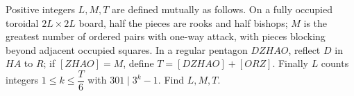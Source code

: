 Positive integers $L,M,T$ are defined mutually as follows. On a fully occupied toroidal $2L\times2L$ board, half the pieces are rooks and half bishops; $M$ is the greatest number of ordered pairs with one-way attack, with pieces blocking beyond adjacent occupied squares. In a regular pentagon $DZHAO$, reflect $D$ in $HA$ to $R$; if $[ZHAO]=M$, define $T=[DZHAO]+[ORZ]$. Finally $L$ counts integers $1\le k\le \dfrac{T}{6}$ with $301\mid3^k-1$. Find $L,M,T$.
